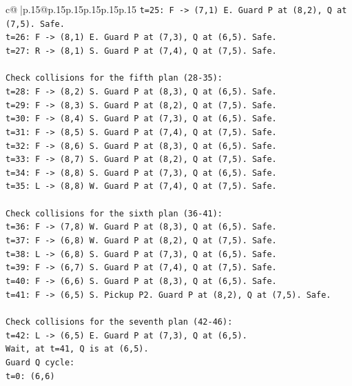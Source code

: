 \documentclass{article}
\begin{document}
{\begin{supertabular}{c@{$\;$}|p{.15\linewidth}@{}p{.15\linewidth}p{.15\linewidth}p{.15\linewidth}p{.15\linewidth}p{.15\linewidth}}
{{{\texttt{t=25: F {-}> (7,1) E. Guard P at (8,2), Q at (7,5). Safe.} \\
\texttt{t=26: F {-}> (8,1) E. Guard P at (7,3), Q at (6,5). Safe.} \\
\texttt{t=27: R {-}> (8,1) S. Guard P at (7,4), Q at (7,5). Safe.} \\
\\ 
\texttt{Check collisions for the fifth plan (28{-}35):} \\
\texttt{t=28: F {-}> (8,2) S. Guard P at (8,3), Q at (6,5). Safe.} \\
\texttt{t=29: F {-}> (8,3) S. Guard P at (8,2), Q at (7,5). Safe.} \\
\texttt{t=30: F {-}> (8,4) S. Guard P at (7,3), Q at (6,5). Safe.} \\
\texttt{t=31: F {-}> (8,5) S. Guard P at (7,4), Q at (7,5). Safe.} \\
\texttt{t=32: F {-}> (8,6) S. Guard P at (8,3), Q at (6,5). Safe.} \\
\texttt{t=33: F {-}> (8,7) S. Guard P at (8,2), Q at (7,5). Safe.} \\
\texttt{t=34: F {-}> (8,8) S. Guard P at (7,3), Q at (6,5). Safe.} \\
\texttt{t=35: L {-}> (8,8) W. Guard P at (7,4), Q at (7,5). Safe.} \\
\\ 
\texttt{Check collisions for the sixth plan (36{-}41):} \\
\texttt{t=36: F {-}> (7,8) W. Guard P at (8,3), Q at (6,5). Safe.} \\
\texttt{t=37: F {-}> (6,8) W. Guard P at (8,2), Q at (7,5). Safe.} \\
\texttt{t=38: L {-}> (6,8) S. Guard P at (7,3), Q at (6,5). Safe.} \\
\texttt{t=39: F {-}> (6,7) S. Guard P at (7,4), Q at (7,5). Safe.} \\
\texttt{t=40: F {-}> (6,6) S. Guard P at (8,3), Q at (6,5). Safe.} \\
\texttt{t=41: F {-}> (6,5) S. Pickup P2. Guard P at (8,2), Q at (7,5). Safe.} \\
\\ 
\texttt{Check collisions for the seventh plan (42{-}46):} \\
\texttt{t=42: L {-}> (6,5) E. Guard P at (7,3), Q at (6,5).} \\
\texttt{Wait, at t=41, Q is at (6,5).} \\
\texttt{Guard Q cycle:} \\
\texttt{t=0: (6,6)} \\
}}}
\end{supertabular}}
\end{document}
